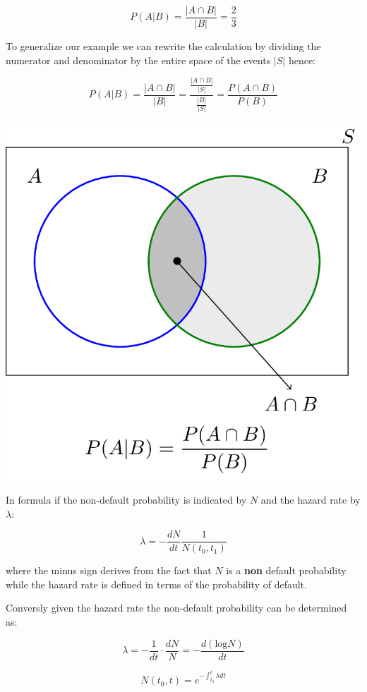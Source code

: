 \documentclass[11pt]{article}
\begin{document}
\[P(A|B) = \frac{|A\cap B|}{|B|} = \frac{2}{3}\]

To generalize our example we can rewrite the calculation by dividing the
numerator and denominator by the entire space of the events \(|S|\)
hence:

\[P(A|B) = \frac{|A\cap B|}{|B|} = \frac{\frac{|A\cap B|}{|S|}}{\frac{|B|}{|S|}} = \frac{P(A\cap B)}{P(B)}\]

\includegraphics[width=0.7\linewidth]{conditional_b.png}

In formula if the non-default probability is indicated by \(N\) and the
hazard rate by \(\lambda\):

\[\lambda = -\frac{dN}{dt}\frac{1}{N(t_0, t_1)}\]

where the minus sign derives from the fact that \(N\) is a \textbf{non}
default probability while the hazard rate is defined in terms of the
probability of default.

Conversly given the hazard rate the non-default probability can be
determined as:

\[\lambda = -\frac{1}{dt}\cdot\frac{dN}{N} = -\frac{d(\textrm{log}N)}{dt}\]

\[N(t_0, t) = e^{-\int_{t_0}^{t}\lambda dt}\]
\end{document}

